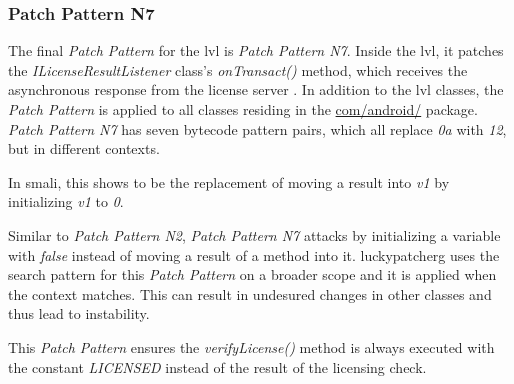 \subsubsection{Patch Pattern N7}
The final \textit{Patch Pattern} for the \gls{lvl} is \textit{Patch Pattern N7}.
Inside the lvl, it patches the \textit{ILicenseResultListener} class's \textit{onTransact()} method, which receives the asynchronous response from the license server \cite{developersLicensingReference}.
In addition to the lvl classes, the \textit{Patch Pattern} is applied to all classes residing in the \url{com/android/} package.
\newline
\textit{Patch Pattern N7} has seven bytecode pattern pairs, which all replace \textit{0a} with \textit{12}, but in different contexts.

In smali, this shows to be the replacement of moving a result into \textit{v1} by initializing \textit{v1}  to \textit{0}.

Similar to \textit{Patch Pattern N2}, \textit{Patch Pattern N7} attacks by initializing a variable with \textit{false} instead of moving a result of a method into it.
\newline
\gls{luckypatcherg} uses the search pattern for this \textit{Patch Pattern} on a broader scope and it is applied when the context matches.
This can result in undesured changes in other classes and thus lead to instability.

This \textit{Patch Pattern} ensures the \textit{verifyLicense()} method is always executed with the constant \textit{LICENSED} instead of the result of the licensing check.

